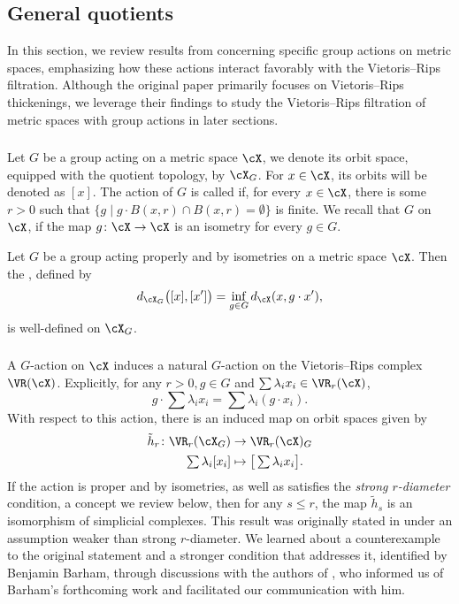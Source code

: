 
\subsection{General quotients}

In this section, we review results from \cite{adams2022metric} concerning specific group actions on metric spaces, emphasizing how these actions interact favorably with the Vietoris--Rips filtration.
Although the original paper primarily focuses on Vietoris--Rips thickenings, we leverage their findings to study the Vietoris--Rips filtration of metric spaces with group actions in later sections.

\subsubsection{}

Let $G$ be a group acting on a metric space $\cX$, we denote its orbit space, equipped with the quotient topology, by $\cX_G$.
For $x \in \cX$, its orbits will be denoted as $[x]$.
The action of $G$ is called  if, for every $x \in \cX$, there is some $r>0$ such that $\{g \mid g\cdot B(x,r) \cap B(x,r) = \emptyset\}$ is finite.
We recall that $G$  on $\cX$, if the map $g \colon \cX \to \cX$ is an isometry for every $g \in G$.

Let $G$ be a group acting properly and by isometries on a metric space $\cX$.
Then the , defined by
\[
d_{\cX_G}\big([x], [x']\big) = \inf_{g \in G} d_\cX(x, g \cdot x'),
\]
is well-defined on $\cX_G$.

\subsubsection{}\label{ss:h}

A \(G\)-action on $\cX$ induces a natural \(G\)-action on the Vietoris--Rips complex $\VR(\cX)$.
Explicitly, for any \(r > 0, g\in G\) and $\sum \lambda_i x_i \in \VR_r(\cX)$,
\[
g \cdot \sum \lambda_i x_i = \sum \lambda_i (g\cdot x_i).
\]
With respect to this action, there is an induced map on orbit spaces given by
\begin{align*}
	\tilde h_r \colon \VR_r(\cX_G) &\to \VR_r(\cX)_G \\
	\textstyle\sum\lambda_i [x_i] &\mapsto \textstyle \big[\sum\lambda_i x_i\big].
\end{align*}
If the action is proper and by isometries, as well as satisfies the \textit{strong \(r\)-diameter} condition, a concept we review below, then for any \(s \leq r\), the map $\tilde{h}_s$ is an isomorphism of simplicial complexes.
This result was originally stated in \cite[Prop.~3.5]{adams2022metric} under an assumption weaker than strong \(r\)-diameter.
We learned about a counterexample to the original statement and a stronger condition that addresses it, identified by Benjamin Barham, through discussions with the authors of \cite{adams2022metric}, who informed us of Barham's forthcoming work and facilitated our communication with him.

